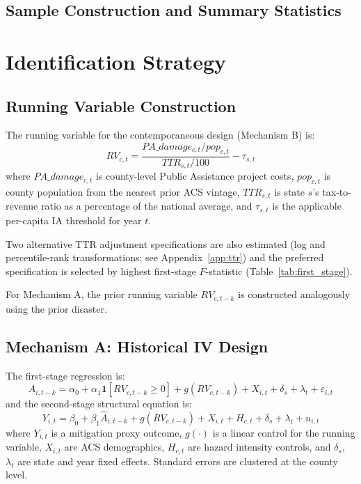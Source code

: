 \documentclass[12pt]{article}
\newcommand{\IA}{\textrm{IA}}
\begin{document}
\subsection{Sample Construction and Summary Statistics}




\section{Identification Strategy}
\label{sec:identification}

\subsection{Running Variable Construction}
\label{sec:running_var}

The running variable for the contemporaneous design (Mechanism B) is:
\begin{equation}
  RV_{c,t} = \frac{PA\_damage_{c,t} / pop_{c,t}}{TTR_{s,t} / 100} - \tau_{s,t}
  \label{eq:rv_linear}
\end{equation}
where $PA\_damage_{c,t}$ is county-level Public Assistance project costs,
$pop_{c,t}$ is county population from the nearest prior ACS vintage,
$TTR_{s,t}$ is state $s$'s tax-to-revenue ratio as a percentage of the national
average, and $\tau_{s,t}$ is the applicable per-capita \IA{} threshold for
year $t$.

Two alternative TTR adjustment specifications are also estimated (log and
percentile-rank transformations; see Appendix~\ref{app:ttr}) and the preferred
specification is selected by highest first-stage $F$-statistic
(Table~\ref{tab:first_stage}).

For Mechanism A, the prior running variable $RV_{c,t-k}$ is constructed
analogously using the prior disaster.

\subsection{Mechanism A: Historical IV Design}

The first-stage regression is:
\begin{equation}
  A_{i,t-k} = \alpha_0 + \alpha_1 \mathbf{1}[RV_{c,t-k} \geq 0]
              + g(RV_{c,t-k}) + X_{i,t} + \delta_s + \lambda_t + \varepsilon_{i,t}
  \label{eq:fs_a}
\end{equation}
and the second-stage structural equation is:
\begin{equation}
  Y_{i,t} = \beta_0 + \beta_1 \hat{A}_{i,t-k}
              + g(RV_{c,t-k}) + X_{i,t} + H_{c,t} + \delta_s + \lambda_t + u_{i,t}
  \label{eq:ss_a}
\end{equation}
where $Y_{i,t}$ is a mitigation proxy outcome, $g(\cdot)$ is a linear control
for the running variable, $X_{i,t}$ are ACS demographics, $H_{c,t}$ are hazard
intensity controls, and $\delta_s$, $\lambda_t$ are state and year fixed effects.
Standard errors are clustered at the county level.
\end{document}
